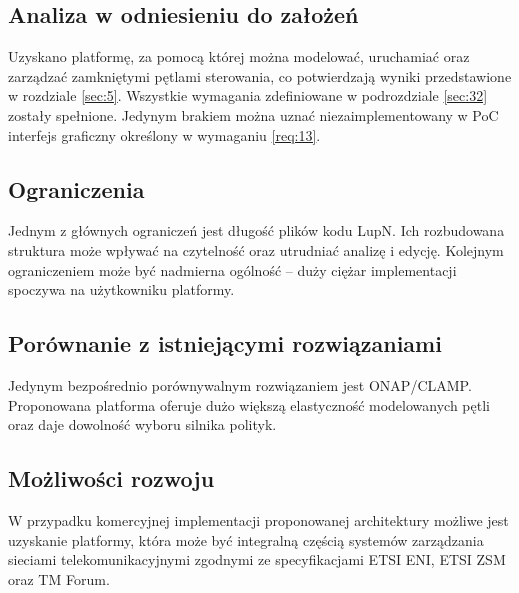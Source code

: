 \subsection{Analiza w odniesieniu do założeń} 
Uzyskano platformę, za pomocą której można modelować, uruchamiać oraz zarządzać zamkniętymi pętlami sterowania, co potwierdzają wyniki przedstawione w rozdziale \ref{sec:5}. 
Wszystkie wymagania zdefiniowane w podrozdziale \ref{sec:32} zostały spełnione. Jedynym brakiem można uznać niezaimplementowany w PoC interfejs graficzny określony w wymaganiu \ref{req:13}. 
\subsection{Ograniczenia}

Jednym z głównych ograniczeń jest długość plików kodu LupN. Ich rozbudowana struktura może wpływać na czytelność oraz utrudniać analizę i edycję. Kolejnym ograniczeniem może być nadmierna ogólność – duży ciężar implementacji spoczywa na użytkowniku platformy. 

\subsection{Porównanie z istniejącymi rozwiązaniami}

Jedynym bezpośrednio porównywalnym rozwiązaniem jest ONAP/CLAMP. Proponowana platforma oferuje dużo większą elastyczność modelowanych pętli oraz daje dowolność wyboru silnika polityk.

\subsection{Możliwości rozwoju}

W przypadku komercyjnej implementacji proponowanej architektury możliwe jest uzyskanie platformy, która może być integralną częścią systemów zarządzania sieciami telekomunikacyjnymi zgodnymi ze specyfikacjami ETSI ENI, ETSI ZSM oraz TM Forum.

